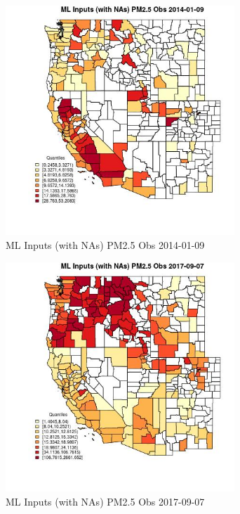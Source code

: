 \begin{figure} 
\centering  
\includegraphics[width=0.77\textwidth]{Code_Outputs/Report_ML_input_PM25_Step4_part_e_de_duplicated_aveswNAs_CountyPM25_ObsMean2014-01-09_2014-01-09.jpg} 
\caption{\label{fig:Report_ML_input_PM25_Step4_part_e_de_duplicated_aveswNAsCountyPM25_ObsMean2014-01-09_2014-01-09}ML Inputs (with NAs) PM2.5 Obs 2014-01-09} 
\end{figure} 
 

\begin{figure} 
\centering  
\includegraphics[width=0.77\textwidth]{Code_Outputs/Report_ML_input_PM25_Step4_part_e_de_duplicated_aveswNAs_CountyPM25_ObsMean2017-09-07_2017-09-07.jpg} 
\caption{\label{fig:Report_ML_input_PM25_Step4_part_e_de_duplicated_aveswNAsCountyPM25_ObsMean2017-09-07_2017-09-07}ML Inputs (with NAs) PM2.5 Obs 2017-09-07} 
\end{figure} 
 

